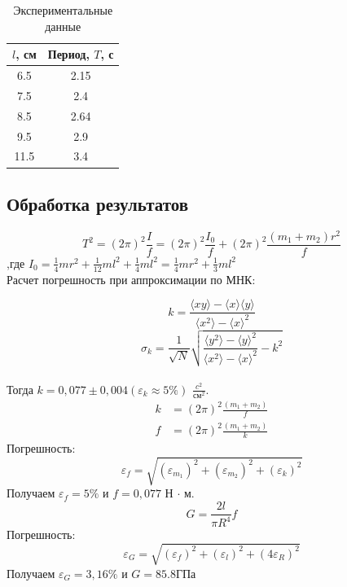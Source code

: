 \documentclass[a4paper]{article}
\begin{document}
\begin{table}[h!]
\begin{center}
\begin{tabular}{|c|c|}
\hline
$l$, см & Период, $T$, с \\ \hline
6.5  & 2.15 \\ \hline
7.5  & 2.4 \\ \hline
8.5  & 2.64 \\ \hline
9.5  & 2.9  \\ \hline
11.5  & 3.4 \\ \hline
\end{tabular}
\caption{Экспериментальные данные}
\end{center}
\end{table}

\newpage
\subsection{Обработка результатов}

\begin{equation}
    T^2 = (2\pi)^2\frac{I}{f} = (2\pi)^2\frac{I_{0}}{f} + (2\pi)^2\frac{(m_{1}+m_{2})r^2}{f}
\end{equation}
,где $I_{0} = \frac{1}{4}mr^2 + \frac{1}{12}ml^2 + \frac{1}{4}ml^2 = \frac{1}{4}mr^2 + \frac{1}{3}ml^2$\\

Расчет погрешность при аппроксимации по МНК:

\[k=\frac{\langle xy\rangle-\langle x\rangle \langle y\rangle}{\langle x^2\rangle - \langle x\rangle^2}\]
\[\sigma_{k} = \frac{1}{\sqrt{N}}\sqrt{\frac{\langle y^2 \rangle - \langle y \rangle ^2}{\langle x^2 \rangle - \langle x \rangle ^2} - k^2}\]\\
Тогда $k = 0,077 \pm  0,004 (\varepsilon_{k} \approx 5\%)$ $\frac{c^2}{\text{см}^2}$.\\
\begin{align}
    k &= (2\pi)^2\frac{(m_{1}+m_{2})}{f}\\
    f &= (2\pi)^2\frac{(m_{1}+m_{2})}{k}
\end{align}
Погрешность:
\[
    \varepsilon_{f} = \sqrt{(\varepsilon_{m_{1}})^2 + (\varepsilon_{m_{2}})^2 + (\varepsilon_{k})^2} 
\]
Получаем $\varepsilon_{f} = 5\%$ и $f = 0,077$ Н $\cdot$ м.\\
\[
    G=\frac{2l}{\pi R^{4}}f
\]
Погрешность:
\[
    \varepsilon_{G} = \sqrt{(\varepsilon_{f})^2 + (\varepsilon_{l})^2 + (4\varepsilon_{R})^2} 
\]
Получаем $\varepsilon_{G} = 3,16\%$ и $G = 85.8 {\text{ГПа}}$ 
\end{document}
